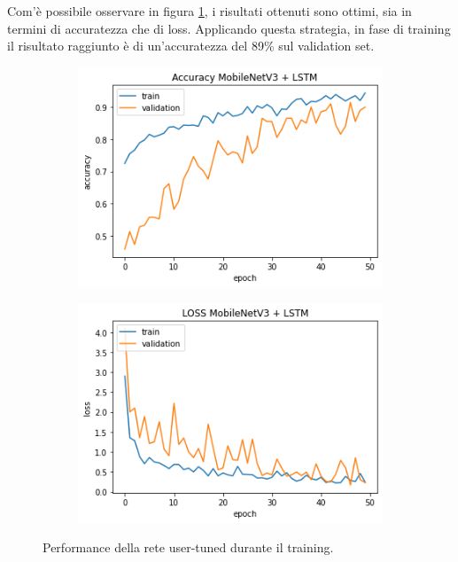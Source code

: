 \documentclass[11pt]{report}
\begin{document}
\vspace{0.5cm}

 Com'è possibile osservare in figura \ref{fig:train-user-tuning}, i risultati ottenuti sono ottimi, sia in termini di accuratezza che di loss. Applicando questa strategia, in fase di training il risultato raggiunto è di un'accuratezza del 89\% sul validation set.

\vspace{0.5cm}

\begin{figure}[h]
\centering
	\begin{subfigure}[t]{.45\textwidth}
	\centering
    \includegraphics[scale = 0.5]{img/user-tuning-accuracy.png}
	\end{subfigure}
	\quad
	\begin{subfigure}[t]{.45\textwidth}
	\centering
    \includegraphics[scale = 0.5]{img/user-tuning-loss.png}
	\end{subfigure}
	\quad
\caption{Performance della rete user-tuned durante il training.}
\label{fig:train-user-tuning}
\end{figure}
\end{document}
